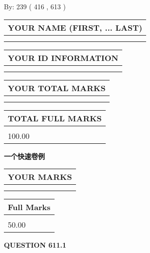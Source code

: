 \documentclass{ctexart}
\begin{document}
   
\hspace{1.0in} By: 
 239 ( 416 ,  613 )
   
   
   
   
\newpage 
\setcounter{page}{ 
   611001 } 
   
   
   
   
\noindent\begin{tabular}{|l|}
\hline
YOUR NAME (FIRST, ... LAST)  \\
\hline
 \\ 
 \\ 
\hline
\end{tabular}
\hspace{0.05in} \begin{tabular}{|l|}
\hline
 YOUR   ID   INFORMATION  \\
\hline
 \\ 
 \\ 
\hline
\end{tabular}
   
   
\vspace{0.2in}\noindent\begin{tabular}{|l|}
\hline
YOUR TOTAL MARKS  \\
\hline
 \\ 
 \\ 
\hline
\end{tabular}
\hspace{0.05in} \begin{tabular}{|l|}
\hline
TOTAL FULL MARKS  \\
\hline
 \\ 
100.00 \\
\hline
\end{tabular}
   
   
 \vspace{0.2in}
{\LARGE {\textbf{ 一个快速卷例}}}
   
   
  
\vspace{0.2in}
  
\noindent\begin{tabular}{|l|}
\hline
 YOUR MARKS  \\
\hline
 \\ 
 \\ 
\hline
\end{tabular}
\hspace{0.05in} \begin{tabular}{|l|}
\hline
 Full Marks  \\
\hline
 \\ 
50.00 \\
\hline
\end{tabular}
{\textbf{\Large{QUESTION
611.1 
}}}
  
\end{document}
